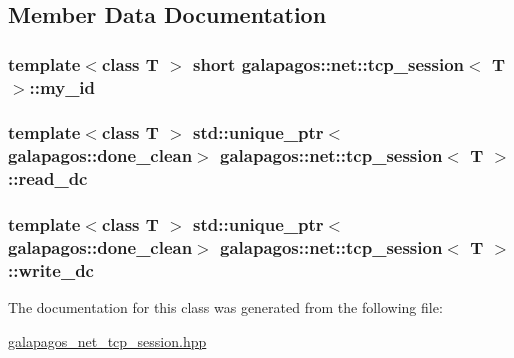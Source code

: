 \subsection{Member Data Documentation}
\subsubsection[{\texorpdfstring{my\+\_\+id}{my_id}}]{\setlength{\rightskip}{0pt plus 5cm}template$<$class T $>$ short {\bf galapagos\+::net\+::tcp\+\_\+session}$<$ {\bf T} $>$\+::my\+\_\+id}\hypertarget{classgalapagos_1_1net_1_1tcp__session_aefce375d01a745fe43f8a95f9287e42c}{}\label{classgalapagos_1_1net_1_1tcp__session_aefce375d01a745fe43f8a95f9287e42c}
\subsubsection[{\texorpdfstring{read\+\_\+dc}{read_dc}}]{\setlength{\rightskip}{0pt plus 5cm}template$<$class T $>$ std\+::unique\+\_\+ptr$<${\bf galapagos\+::done\+\_\+clean}$>$ {\bf galapagos\+::net\+::tcp\+\_\+session}$<$ {\bf T} $>$\+::read\+\_\+dc}\hypertarget{classgalapagos_1_1net_1_1tcp__session_a532c328580ac4fcd0fc6fd5eea889b9d}{}\label{classgalapagos_1_1net_1_1tcp__session_a532c328580ac4fcd0fc6fd5eea889b9d}
\subsubsection[{\texorpdfstring{write\+\_\+dc}{write_dc}}]{\setlength{\rightskip}{0pt plus 5cm}template$<$class T $>$ std\+::unique\+\_\+ptr$<${\bf galapagos\+::done\+\_\+clean}$>$ {\bf galapagos\+::net\+::tcp\+\_\+session}$<$ {\bf T} $>$\+::write\+\_\+dc}\hypertarget{classgalapagos_1_1net_1_1tcp__session_ac368eff45244f67202dab352444f0369}{}\label{classgalapagos_1_1net_1_1tcp__session_ac368eff45244f67202dab352444f0369}


The documentation for this class was generated from the following file\+:\begin{DoxyCompactItemize}
\item 
\hyperlink{galapagos__net__tcp__session_8hpp}{galapagos\+\_\+net\+\_\+tcp\+\_\+session.\+hpp}\end{DoxyCompactItemize}
